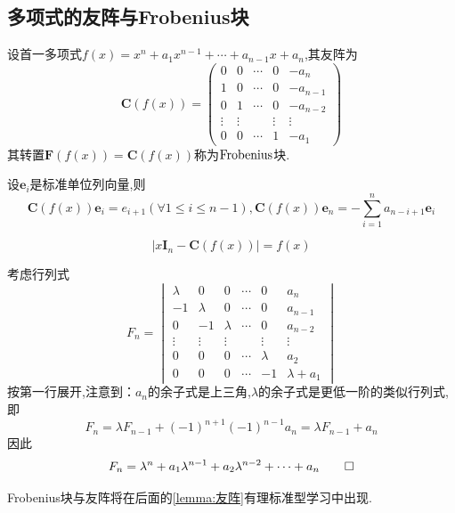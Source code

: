 \subsection{多项式的友阵与Frobenius块}
\begin{formal}
\begin{definition}[定义]\label{def:多项式的友阵与Frobenius块}
    设首一多项式$f\left(x\right)=x^n+a_1x^{n-1}+\cdots+a_{n-1}x+a_n$,其友阵为
    \[
    \bm{C}\left(f\left(x\right)\right)=\begin{pmatrix}
        0&0&\cdots&0&-a_n\\
        1&0&\cdots&0&-a_{n-1}\\
        0&1&\cdots&0&-a_{n-2}\\
        \vdots&\vdots&&\vdots&\vdots\\
        0&0&\cdots&1&-a_1
    \end{pmatrix}
    \]
    其转置$\bm{F}\left(f\left(x\right)\right)=
    \bm{C}\left(f\left(x\right)\right)$称为$\textup{Frobenius}$块.
\end{definition}
\end{formal}
\newpage
\begin{formal}
\begin{proposition}[友阵的性质]\label{prop:友阵的性质}
    设$\bm{e}_i$是标准单位列向量,则\[
    \bm{C}\left(f\left(x\right)\right)\bm{e}_i=e_{i+1}\left(\forall 1\leqslant i\leqslant n-1\right),
    \bm{C}\left(f\left(x\right)\right)\bm{e}_n=-\sum_{i=1}^{n}a_{n-i+1}\bm{e}_i
    \]
\end{proposition}
\end{formal}
\begin{formal}
\begin{theorem}[友阵与原多项式关系]\label{thm:友阵与原多项式关系}
    \[
    \left|x\bm{I}_n-\bm{C}\left(f\left(x\right)\right)\right|=f\left(x\right)
    \]
\end{theorem}
\begin{Proof}
考虑行列式
\[
F_n=\begin{vmatrix}
    \lambda&0&0&\cdots&0&a_n\\
    -1&\lambda&0&\cdots&0&a_{n-1}\\
    0&-1&\lambda&\cdots&0&a_{n-2}\\
    \vdots&\vdots&\vdots&&\vdots&\vdots\\
    0&0&0&\cdots&\lambda&a_2\\
    0&0&0&\cdots&-1&\lambda+a_1
\end{vmatrix}
\]
按第一行展开,注意到：$a_n$的余子式是上三角,$\lambda$的余子式是更低一阶的类似行列式,即\[
F_n=\lambda F_{n-1}+\left(-1\right)^{n+1}\left(-1\right)^{n-1}a_n=\lambda F_{n-1}+a_n
\]
因此\[
F_n=\lambda^n+a_1\lambda^{n-1}+a_2\lambda^{n-2}+\cdots+a_n\qedhere
\]
\end{Proof}
\end{formal}
\begin{red}
\begin{remark}
    \textup{Frobenius}块与友阵将在后面的\cref{lemma:友阵}有理标准型学习中出现.
\end{remark}
\end{red}
